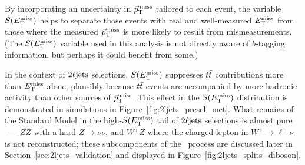 By incorporating an uncertainty in $\vec p_\mathrm{T}^\mathrm{\:miss}$ tailored to each event, the
variable $S(E_\mathrm{T}^\mathrm{miss})$ helps to separate those events with real and well-measured
$E_\mathrm{T}^\mathrm{miss}$ from those where the measured $\vec p_\mathrm{T}^\mathrm{\:miss}$ is more likely to result from
mismeasurements.
(The $S(E_\mathrm{T}^\mathrm{miss})$ variable used in this analysis is not directly
aware of $b$-tagging information, but perhaps it could benefit from some.)

In the context of $2\ell\mathrm{jets}$ selections, $S(E_\mathrm{T}^\mathrm{miss})$ suppresses $t\bar t$
contributions more than $E_\mathrm{T}^\mathrm{miss}$ alone, plausibly because $t\bar t$ events are
accompanied by more hadronic activity than other sources of $\vec p_\mathrm{T}^\mathrm{\:miss}$.
This effect in the $S(E_\mathrm{T}^\mathrm{miss})$ distribution is demonstrated in simulations in
Figure~\ref{fig:2ljets_presel_met}.
What remains of the Standard Model in the high-$S(E_\mathrm{T}^\mathrm{miss})$ tail of $2\ell\mathrm{jets}$
selections is almost pure \diboson\ --- $ZZ$ with a hard $Z\to \nu\nu$,
and $W^\pm Z$ where the charged lepton in $W^\pm\to\ell^\pm\nu$
is not reconstructed; these subcomponents of the \diboson\ process are discussed
later in Section~\ref{sec:2ljets_validation} and displayed in
Figure~\ref{fig:2ljets_splits_diboson}.

